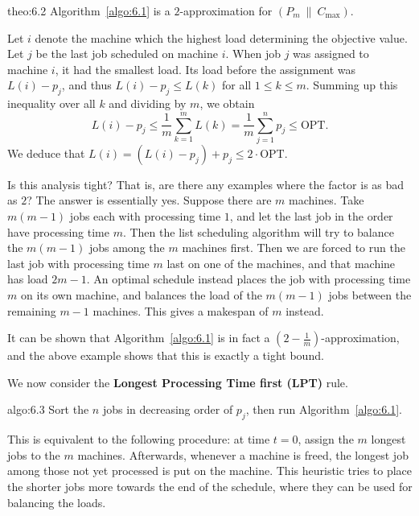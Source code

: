\begin{theo}{theo:6.2}
    Algorithm~\ref{algo:6.1} is a $2$-approximation for $(P_m~\|~C_{\max})$. 
\end{theo}
\begin{pf}
    Let $i$ denote the machine which the highest load determining the objective 
    value. Let $j$ be the last job scheduled on machine $i$. When job $j$ was 
    assigned to machine $i$, it had the smallest load. Its load before the 
    assignment was $L(i) - p_j$, and thus $L(i) - p_j \leq L(k)$ for all 
    $1 \leq k \leq m$. Summing up this inequality over all $k$ and 
    dividing by $m$, we obtain 
    \[ L(i) - p_j \leq \frac1m \sum_{k=1}^m L(k) = \frac1m \sum_{j=1}^n p_j 
    \leq \text{OPT}. \] 
    We deduce that $L(i) = (L(i) - p_j) + p_j \leq 2 \cdot \text{OPT}$. 
\end{pf}

Is this analysis tight? That is, are there any examples where the factor 
is as bad as $2$? The answer is essentially yes. Suppose there are $m$ machines.
Take $m(m-1)$ jobs each with processing time $1$, and let the last job 
in the order have processing time $m$. Then the list scheduling algorithm 
will try to balance the $m(m-1)$ jobs among the $m$ machines first. Then 
we are forced to run the last job with processing time $m$ last on one 
of the machines, and that machine has load $2m - 1$. An optimal schedule 
instead places the job with processing time $m$ on its own machine, 
and balances the load of the $m(m-1)$ jobs between the remaining $m-1$ 
machines. This gives a makespan of $m$ instead. 

It can be shown that Algorithm~\ref{algo:6.1} is in fact a 
$(2 - \frac1m)$-approximation, and the above example shows that this is 
exactly a tight bound. 

We now consider the {\bf Longest Processing Time first (LPT)} rule.

\begin{algo}[LPT]{algo:6.3}
    Sort the $n$ jobs in decreasing order of $p_j$, then run 
    Algorithm~\ref{algo:6.1}.
\end{algo}

This is equivalent to the following procedure: at time $t = 0$, 
assign the $m$ longest jobs to the $m$ machines. Afterwards, 
whenever a machine is freed, the longest job among those not yet processed is 
put on the machine. This heuristic tries to place the shorter jobs more towards 
the end of the schedule, where they can be used for balancing the loads.

